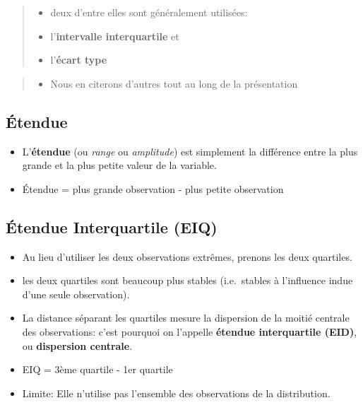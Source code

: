 \documentclass[
]{article}
\providecommand{\tightlist}{%
  \setlength{\itemsep}{0pt}\setlength{\parskip}{0pt}}
\begin{document}
\begin{quote}
\begin{itemize}
\tightlist
\item
  deux d'entre elles sont généralement utilisées:
\item
  l'\textbf{intervalle interquartile} et
\item
  l'\textbf{écart type}
\end{itemize}
\end{quote}

\begin{quote}
\begin{itemize}
\tightlist
\item
  Nous en citerons d'autres tout au long de la présentation
\end{itemize}
\end{quote}

\hypertarget{uxe9tendue}{%
\subsection{Étendue}\label{uxe9tendue}}

\begin{itemize}
\item
  L'\textbf{étendue} (ou \emph{range} ou \emph{amplitude}) est
  simplement la différence entre la plus grande et la plus petite valeur
  de la variable.
\item
  Étendue = plus grande observation - plus petite observation
\end{itemize}

\hypertarget{uxe9tendue-interquartile-eiq}{%
\subsection{Étendue Interquartile
(EIQ)}\label{uxe9tendue-interquartile-eiq}}

\begin{itemize}
\item
  Au lieu d'utiliser les deux observations extrêmes, prenons les deux
  quartiles.
\item
  les deux quartiles sont beaucoup plus stables (i.e.~stables à
  l'influence indue d'une seule observation).
\item
  La distance séparant les quartiles mesure la dispersion de la moitié
  centrale des observations: c'est pourquoi on l'appelle \textbf{étendue
  interquartile (EID)}, ou \textbf{dispersion centrale}.
\item
  EIQ = 3ème quartile - 1er quartile
\item
  Limite: Elle n'utilise pas l'ensemble des observations de la
  distribution.
\end{itemize}
\end{document}
